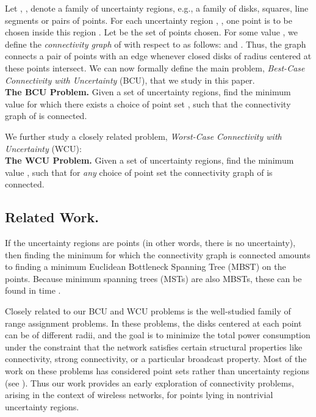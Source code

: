 Let , , denote a family of uncertainty regions, e.g., a family of disks, squares, line segments or pairs of points.  For each uncertainty region , , one point  is to be chosen inside this region .  Let  be the set of points chosen. For some value , we define the {\em connectivity graph}  of  with respect to  as follows:  and .  Thus, the graph connects a pair of points with an edge whenever closed disks of radius  centered at these points intersect. We can now formally define the main problem, {\em Best-Case Connectivity with Uncertainty} (BCU), that we study in this paper.\\

\noindent
{\bf The BCU Problem.}
\label{problem2}
Given a set  of  uncertainty regions, find the minimum value  for which there exists a choice of point set , such that the connectivity graph  of  is connected.

\medskip
\noindent We further study a closely related problem, {\em Worst-Case  Connectivity with Uncertainty} (WCU):\\

\noindent
{\bf The WCU Problem.}
Given a set  of  uncertainty regions, find the minimum value ,
such that for {\em any} choice of point set  the connectivity graph  of  is connected.


\subsection{Related Work.}
If the  uncertainty regions are points (in other words, there is no uncertainty),
then finding the minimum  for which the connectivity graph is connected amounts to finding a
minimum Euclidean Bottleneck Spanning Tree (MBST) on the points.  Because minimum spanning trees
(MSTs) are also MBSTs, these can be found in time .

Closely related to our BCU and WCU problems is the  well-studied family of {\rm range assignment} problems.
In these problems, the disks centered at each point can be of different radii,
and the goal is to minimize the total power consumption under the constraint
that the network satisfies certain structural properties like connectivity,
strong connectivity, or a particular broadcast property.
  Most of the work on these problems has considered point sets rather than
uncertainty regions (see \cite{cps-opapr-00,lp-eaasb-02,lp-ptasb-05,SCG06,fuchs-06}).
  Thus our work provides an early exploration of connectivity problems, arising in the context of wireless networks, for points lying in nontrivial uncertainty regions.

